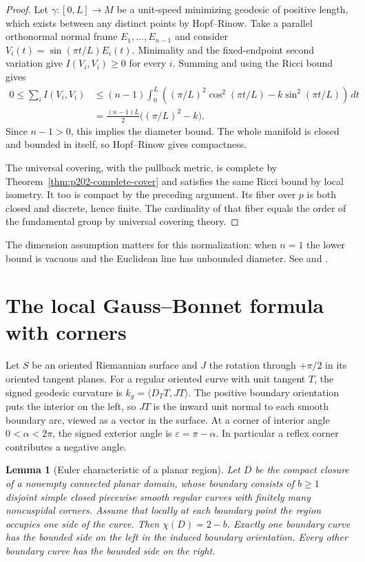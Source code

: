 \documentclass[11pt,oneside,openany]{book}
\theoremstyle{plain}
\newtheorem{lemma}[theorem]{Lemma}
\theoremstyle{definition}
\theoremstyle{remark}
\begin{document}
\begin{proof}
Let \(\gamma:[0,L]\to M\) be a unit-speed minimizing
geodesic of positive length, which exists between any
distinct points by Hopf--Rinow. Take a parallel orthonormal
normal frame \(E_1,\ldots,E_{n-1}\) and consider
\(V_i(t)=\sin(\pi t/L)E_i(t)\). Minimality and the fixed-endpoint
second variation give \(I(V_i,V_i)\ge0\) for every \(i\).
Summing and using the Ricci bound gives
\[
 \begin{aligned}
 0\le \sum_i I(V_i,V_i)
 &\le (n-1)\int_0^L
 \left((\pi/L)^2\cos^2(\pi t/L)-k\sin^2(\pi t/L)\right)\,dt\\
 &=\frac{(n-1)L}{2}\big((\pi/L)^2-k\big).
 \end{aligned}
\]
Since \(n-1>0\), this implies the diameter bound.
The whole manifold is closed and bounded in itself, so
Hopf--Rinow gives compactness.

The universal covering, with the pullback metric, is
complete by Theorem~\ref{thm:p202-complete-cover} and
satisfies the same Ricci bound by local isometry.
It too is compact by the preceding argument. Its
fiber over \(p\) is both closed and discrete, hence
finite. The cardinality of that fiber equals the order
of the fundamental group by universal covering theory.
\end{proof}

The dimension assumption matters for this normalization:
when \(n=1\) the lower bound is vacuous and the Euclidean
line has unbounded diameter. See
\cite[Chapter 12, Theorem 12.24]{LeeRM}
and \cite[Chapter 9, Section 3]{dC}.

\section{The local Gauss--Bonnet formula with corners}
\label{p202:G25}

Let \(S\) be an oriented Riemannian surface and \(J\) the
rotation through \(+\pi/2\) in its oriented tangent planes.
For a regular oriented curve with unit tangent \(T\), the
signed geodesic curvature is \(k_g=\langle D_TT,JT\rangle\).
The positive boundary orientation puts the interior on
the left, so \(JT\) is the inward unit normal to each
smooth boundary arc, viewed as a vector in the surface.
At a corner of interior angle \(0<\alpha<2\pi\), the
signed exterior angle is \(\varepsilon=\pi-\alpha\).
In particular a reflex corner contributes a negative angle.

\begin{lemma}[Euler characteristic of a planar region]
\label{lem:p202-planar-region}
Let \(D\) be the compact closure of a nonempty connected planar
domain, whose boundary consists of \(b\ge1\) disjoint simple closed
piecewise smooth regular curves with finitely many noncuspidal
corners. Assume that locally at each boundary point the region
occupies one side of the curve. Then \(\chi(D)=2-b\).
Exactly one boundary curve has the bounded side on the left in
the induced boundary orientation. Every other boundary curve
has the bounded side on the right.
\end{lemma}
\end{document}
